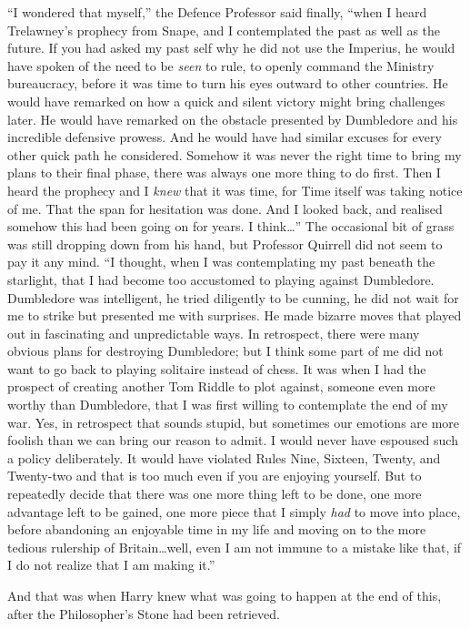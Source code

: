 “I wondered that myself,” the Defence Professor said finally, “when I heard
Trelawney’s prophecy from Snape, and I contemplated the past as well as the
future. If you had asked my past self why he did not use the Imperius, he would
have spoken of the need to be \emph{seen} to rule, to openly command the
Ministry bureaucracy, before it was time to turn his eyes outward to other
countries. He would have remarked on how a quick and silent victory might bring
challenges later. He would have remarked on the obstacle presented by
Dumbledore and his incredible defensive prowess. And he would have had similar
excuses for every other quick path he considered. Somehow it was never the
right time to bring my plans to their final phase, there was always one more
thing to do first. Then I heard the prophecy and I \emph{knew} that it was
time, for Time itself was taking notice of me. That the span for hesitation was
done. And I looked back, and realised somehow this had been going on for years.
I think…” The occasional bit of grass was still dropping down from his
hand, but Professor Quirrell did not seem to pay it any mind. “I thought, when
I was contemplating my past beneath the starlight, that I had become too
accustomed to playing against Dumbledore. Dumbledore was intelligent, he tried
diligently to be cunning, he did not wait for me to strike but presented me
with surprises. He made bizarre moves that played out in fascinating and
unpredictable ways. In retrospect, there were many obvious plans for destroying
Dumbledore; but I think some part of me did not want to go back to playing
solitaire instead of chess. It was when I had the prospect of creating another
Tom Riddle to plot against, someone even more worthy than Dumbledore, that I
was first willing to contemplate the end of my war. Yes, in retrospect that
sounds stupid, but sometimes our emotions are more foolish than we can bring
our reason to admit. I would never have espoused such a policy deliberately. It
would have violated Rules Nine, Sixteen, Twenty, and Twenty-two and that is too
much even if you are enjoying yourself. But to repeatedly decide that there was
one more thing left to be done, one more advantage left to be gained, one more
piece that I simply \emph{had} to move into place, before abandoning an
enjoyable time in my life and moving on to the more tedious rulership of
Britain…well, even I am not immune to a mistake like that, if I do not
realize that I am making it.”

And that was when Harry knew what was going to happen at the end of this, after
the Philosopher’s Stone had been retrieved.

